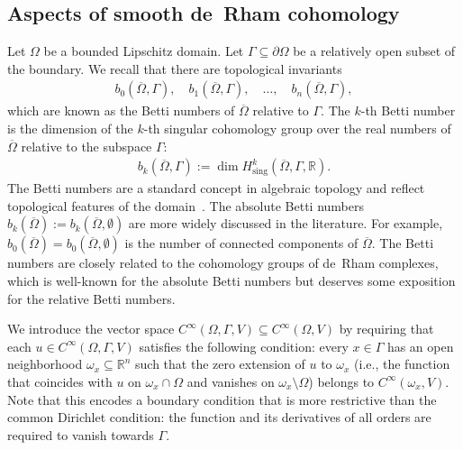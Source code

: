 \documentclass[10pt,a4paper]{amsart}
\theoremstyle{definition}
\theoremstyle{remark}
\numberwithin{equation}{section}
\newcommand{\bbR}{{\mathbb R}}
\newcommand{\closure}{\overline}
\newcommand{\Domain}{{\Omega}}
\newcommand{\subdomain}{{\omega}}
\newcommand{\VEC}{{V}}
\begin{document}
\subsection{Aspects of smooth de~Rham cohomology}

Let $\Domain$ be a bounded Lipschitz domain.
Let $\Gamma \subseteq \partial\Domain$ be a relatively open subset of the boundary. 
We recall that there are topological invariants 
\begin{align*}
    b_{0}(\closure\Domain,\Gamma), \quad b_{1}(\closure\Domain,\Gamma), \quad \dots, \quad b_{n}(\closure\Domain,\Gamma),
\end{align*}
which are known as the Betti numbers of $\closure\Domain$ relative to $\Gamma$. 
The $k$-th Betti number is the dimension of the $k$-th singular cohomology group over the real numbers of $\closure\Domain$ relative to the subspace $\Gamma$: 
\begin{align}\label{math:definition-of-betti-numbers}
    b_{k}(\closure\Domain,\Gamma) := \dim H^{k}_{\mathrm{sing}}(\closure\Domain,\Gamma,\bbR).
\end{align}
The Betti numbers are a standard concept in algebraic topology and reflect topological features of the domain~\cite{stocker_zieschang}.
The absolute Betti numbers $b_{k}(\closure\Domain) := b_{k}( \closure\Domain, \emptyset )$ are more widely discussed in the literature.
For example, $b_{0}(\closure\Domain) = b_{0}(\closure\Domain,\emptyset)$ is the number of connected components of $\closure\Domain$. 
The Betti numbers are closely related to the cohomology groups of de~Rham complexes,
which is well-known for the absolute Betti numbers but deserves some exposition for the relative Betti numbers. 


We introduce the vector space $C^{\infty}(\Domain,\Gamma,\VEC) \subseteq C^{\infty}(\Domain,\VEC)$
by requiring that each $u \in C^{\infty}(\Domain,\Gamma,\VEC)$ satisfies the following condition:
every $x \in \Gamma$ has an open neighborhood $\subdomain_x \subseteq \bbR^{n}$
such that the zero extension of $u$ to $\subdomain_x$ (i.e., the function that coincides with $u$ on $\subdomain_x \cap \Domain$ and vanishes on $\subdomain_x \setminus \Domain$) belongs to $C^{\infty}(\subdomain_x,\VEC)$. 
Note that this encodes a boundary condition that is more restrictive than the common Dirichlet condition: 
the function and its derivatives of all orders are required to vanish towards $\Gamma$.
\end{document}
